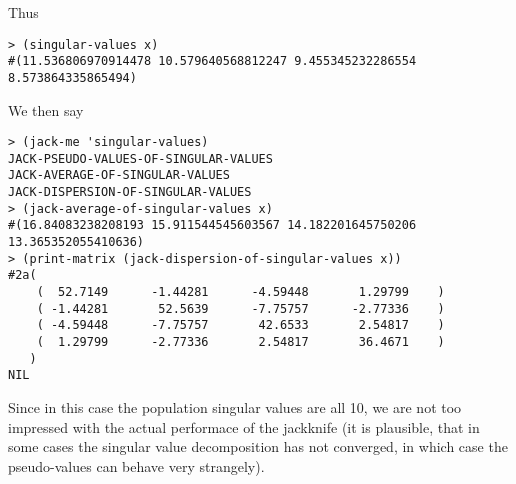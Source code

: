 \documentclass{amsart}
\theoremstyle{definition}
\theoremstyle{remark}
\numberwithin{equation}{section}
\begin{document}
Thus
\begin{verbatim}
> (singular-values x)
#(11.536806970914478 10.579640568812247 9.455345232286554 8.573864335865494)
\end{verbatim}
We then say 
\begin{verbatim}
> (jack-me 'singular-values)
JACK-PSEUDO-VALUES-OF-SINGULAR-VALUES
JACK-AVERAGE-OF-SINGULAR-VALUES
JACK-DISPERSION-OF-SINGULAR-VALUES
> (jack-average-of-singular-values x)
#(16.84083238208193 15.911544545603567 14.182201645750206
13.365352055410636)
> (print-matrix (jack-dispersion-of-singular-values x))
#2a(
    (  52.7149      -1.44281      -4.59448       1.29799    )
    ( -1.44281       52.5639      -7.75757      -2.77336    )
    ( -4.59448      -7.75757       42.6533       2.54817    )
    (  1.29799      -2.77336       2.54817       36.4671    )
   )
NIL
\end{verbatim}
Since in this case the population singular values are
all 10, we are not too impressed with the actual performace
of the jackknife (it is plausible, that in some cases the
singular value decomposition has not converged, in which case
the pseudo-values can behave very strangely).


\end{document}
